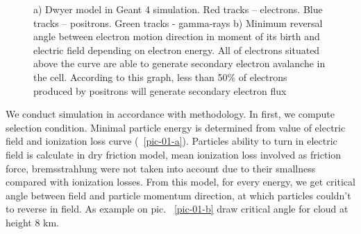 \documentclass{webofc}
\begin{document}
\begin{figure}[ht!]
    \caption{
    a) Dwyer model in Geant 4 simulation. Red tracks – electrons. Blue tracks – positrons. Green tracks - gamma-rays
    b) Minimum reversal angle between electron motion direction in moment of its birth and electric field depending on electron energy. All of electrons situated above the curve are able to generate secondary electron avalanche in the cell. According to this graph, less than 50\% of electrons produced by positrons will generate secondary electron flux}
\end{figure}

We conduct simulation in accordance with methodology. In first, we compute selection condition. Minimal particle energy is determined from value of electric field and ionization loss curve (~\ref{pic-01-a}). Particles ability to turn in electric field is calculate in dry friction model, mean ionization loss involved as friction force, bremsstrahlung were not taken into account due to their smallness compared with ionization losses. From this model, for every energy, we get critical angle between field and particle momentum direction, at which particles couldn't to reverse in field. As example on pic. ~\ref{pic-01-b} draw critical angle for cloud at height 8 km.
\end{document}
